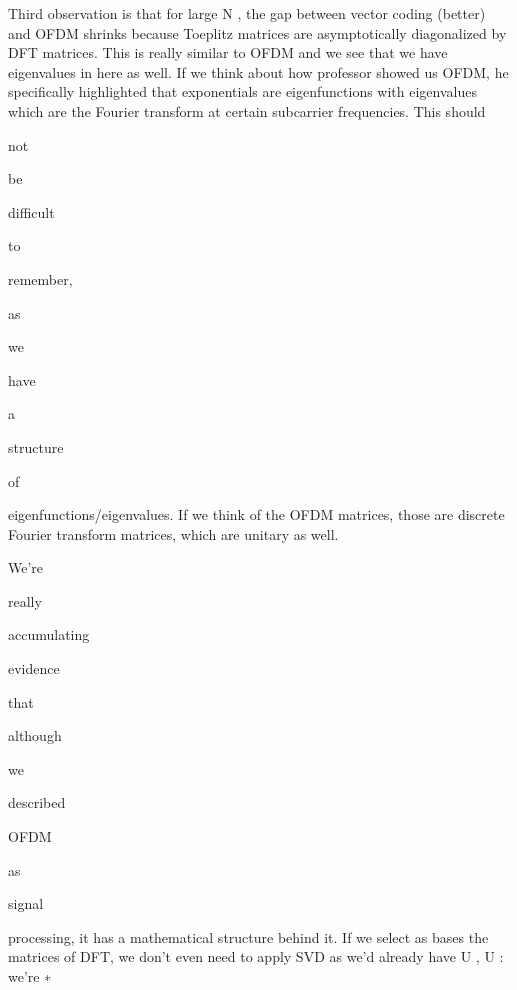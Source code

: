 {{{{{Third observation is that for large N , the gap between vector coding (better) and OFDM shrinks because Toeplitz matrices are asymptotically diagonalized by DFT matrices.
This is really similar to OFDM and we see that we have eigenvalues in here as well. If we think about how professor showed us OFDM, he specifically highlighted that exponentials are eigenfunctions with eigenvalues which are the Fourier transform at certain subcarrier frequencies.
This should

not

be

difficult

to

remember,

as

we

have

a

structure

of

eigenfunctions/eigenvalues.
If we think of the OFDM matrices, those are discrete Fourier transform matrices, which are unitary as well.

We're

really

accumulating

evidence

that

although

we

described

OFDM

as

signal

processing, it has a mathematical structure behind it. If we select as bases the matrices of DFT, we don't even need to apply SVD as we'd already have U , U : we're
∗

}}}}}
